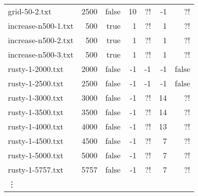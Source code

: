 \documentclass{tufte-handout}
\begin{document}
\begin{tabular}{lrrrrrr}
grid-50-2.txt&	2500 &	false &	10 &	?! &	-1 &	?! &	\\
increase-n500-1.txt&	500 &	true &	1 &	?! &	1 &	?! &	\\
increase-n500-2.txt&	500 &	true &	1 &	?! &	1 &	?! &	\\
increase-n500-3.txt&	500 &	true &	1 &	?! &	1 &	?! &	\\
rusty-1-2000.txt&	2000 &	false &	-1 &	-1 &	-1 &	false &	\\
rusty-1-2500.txt&	2500 &	false &	-1 &	-1 &	-1 &	false &	\\
rusty-1-3000.txt&	3000 &	false &	-1 &	?! &	14 &	?! &	\\
rusty-1-3500.txt&	3500 &	false &	-1 &	?! &	14 &	?! &	\\
rusty-1-4000.txt&	4000 &	false &	-1 &	?! &	13 &	?! &	\\
rusty-1-4500.txt&	4500 &	false &	-1 &	?! &	7 &	?! &	\\
rusty-1-5000.txt&	5000 &	false &	-1 &	?! &	7 &	?! &	\\
rusty-1-5757.txt&	5757 &	false &	-1 &	?! &	7 &	?! &	\\
    \vdots
  \bottomrule
\end{tabular}
\end{document}
